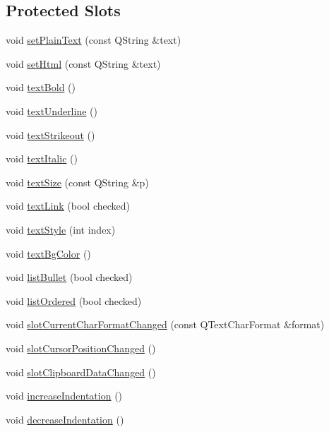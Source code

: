 \subsection*{Protected Slots}
\begin{DoxyCompactItemize}
\item 
void \hyperlink{class_m_rich_text_edit_ad7a79914eacdc07f3e105855174289c8}{set\+Plain\+Text} (const Q\+String \&text)
\item 
void \hyperlink{class_m_rich_text_edit_a52a6c896bf5a1b407f16b0a3a7031c40}{set\+Html} (const Q\+String \&text)
\item 
void \hyperlink{class_m_rich_text_edit_ac2e33af72becea52f64bfb1d7165115b}{text\+Bold} ()
\item 
void \hyperlink{class_m_rich_text_edit_a7f013622e60f98d6a8cd6d8f2c788193}{text\+Underline} ()
\item 
void \hyperlink{class_m_rich_text_edit_a11df72c1d0396d6a2e4f028bd406421e}{text\+Strikeout} ()
\item 
void \hyperlink{class_m_rich_text_edit_adcfc0e2f06203c7e22e4fa4663942dff}{text\+Italic} ()
\item 
void \hyperlink{class_m_rich_text_edit_af840a5cb3eb901ed586bf98b2996109b}{text\+Size} (const Q\+String \&p)
\item 
void \hyperlink{class_m_rich_text_edit_adacb62d89f970e019f2658116ed76a0a}{text\+Link} (bool checked)
\item 
void \hyperlink{class_m_rich_text_edit_a5c41f7b668beb06a2c71e172cf95d2bf}{text\+Style} (int index)
\item 
void \hyperlink{class_m_rich_text_edit_a8bb2f4d357c4c33d8558d4bb7eb46825}{text\+Bg\+Color} ()
\item 
void \hyperlink{class_m_rich_text_edit_af86f940f72d448a6ecfe731e6bdbb98f}{list\+Bullet} (bool checked)
\item 
void \hyperlink{class_m_rich_text_edit_aaa77f74bbcce2a1a8ec423c776aaf500}{list\+Ordered} (bool checked)
\item 
void \hyperlink{class_m_rich_text_edit_a9c1d95d6b9c146e793dad1319a1c3f3b}{slot\+Current\+Char\+Format\+Changed} (const Q\+Text\+Char\+Format \&format)
\item 
void \hyperlink{class_m_rich_text_edit_af25f0e17deb09be9b9b0266e32047e33}{slot\+Cursor\+Position\+Changed} ()
\item 
void \hyperlink{class_m_rich_text_edit_aa2db946c02eddaf11f165e3a1d609248}{slot\+Clipboard\+Data\+Changed} ()
\item 
void \hyperlink{class_m_rich_text_edit_a6d3085a8a01f764dd2166e509deb4e01}{increase\+Indentation} ()
\item 
void \hyperlink{class_m_rich_text_edit_aeff5b59b93995ef9ad87a538f1ebcb9a}{decrease\+Indentation} ()
\end{DoxyCompactItemize}
